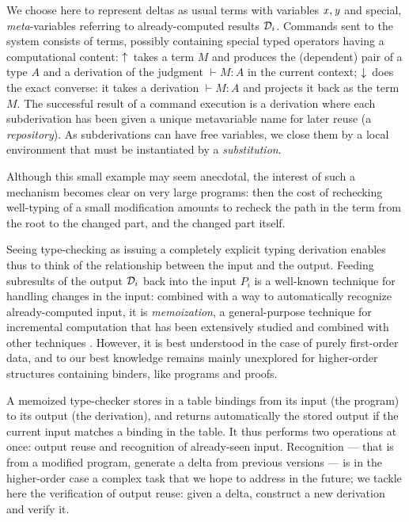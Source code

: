 \documentclass{llncs}
\begin{document}
We choose here to represent deltas as usual terms with variables $\text{\textit{x}}, \text{\textit{y}}$ and special, \emph{meta}-variables referring to
already-computed results $\mathcal D_i$. Commands sent to the system consists
of terms, possibly containing special typed operators having a
computational content: $\uparrow\!{}$ takes a term $M$ and produces the
(dependent) pair of a type $A$ and a derivation of the judgment
$\vdash M:A$ in the current context; $\downarrow\!{}$ does the exact
converse: it takes a derivation $\vdash M:A$ and projects it back as
the term $M$. The successful result of a command execution is a
derivation where each subderivation has been given a unique
metavariable name for later reuse (a \emph{repository}). As
subderivations can have free variables, we close them by a local
environment that must be instantiated by a \emph{substitution}.

Although this small example may seem anecdotal, the interest of such a
mechanism becomes clear on very large programs: then the cost of
rechecking well-typing of a small modification amounts to recheck the
path in the term from the root to the changed part, and the changed
part itself.

Seeing type-checking as issuing a completely explicit typing
derivation enables thus to think of the relationship between the input
and the output. Feeding subresults of the output $\mathcal D_i$ back into the
input $P_i$ is a well-known technique for handling changes in the
input: combined with a way to automatically recognize already-computed
input, it is \emph{memoization}, a general-purpose technique for
incremental computation that has been extensively studied and combined
with other techniques \cite{acar2006,pugh1989incremental}. However, it
is best understood in the case of purely first-order data, and to our
best knowledge remains mainly unexplored for higher-order structures
containing binders, like programs and proofs.

A memoized type-checker stores in a table bindings from its input (the
program) to its output (the derivation), and returns automatically the
stored output if the current input matches a binding in the table. It
thus performs two operations at once: output reuse and recognition of
already-seen input. Recognition --- that is from a modified program,
generate a delta from previous versions --- is in the higher-order
case a complex task that we hope to address in the future; we tackle
here the verification of output reuse: given a delta, construct a new
derivation and verify it.
\end{document}
